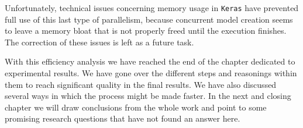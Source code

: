 		Unfortunately, technical issues concerning memory usage in \texttt{Keras} have prevented full use of this last type of parallelism, because concurrent model creation seems to leave a memory bloat that is not properly freed until the execution finishes. The correction of these issues is left as a future task.

		With this efficiency analysis we have reached the end of the chapter dedicated to experimental results. We have gone over the different steps and reasonings within them to reach significant quality in the final results. We have also discussed several ways in which the process might be made faster. In the next and closing chapter we will draw conclusions from the whole work and point to some promising research questions that have not found an answer here.